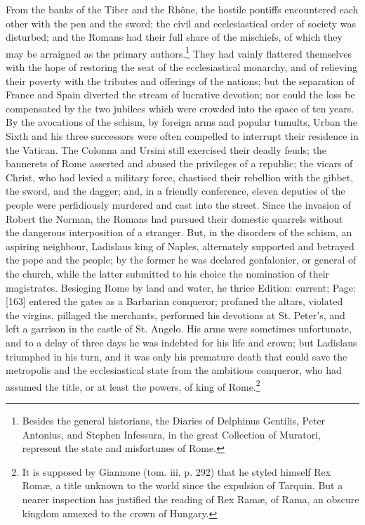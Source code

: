 From the banks of the Tiber and the Rhône, the hostile pontiffs encountered each other with the pen and the sword; the civil and ecclesiastical order of society was disturbed; and the Romans had their full share of the mischiefs, of which they may be arraigned as the primary authors.\footnote{Besides the general historians, the Diaries of Delphinus Gentilis, Peter Antonius, and Stephen Infessura, in the great Collection of Muratori, represent the state and misfortunes of Rome.} They had vainly flattered themselves with the hope of restoring the seat of the ecclesiastical monarchy, and of relieving their poverty with the tributes and offerings of the nations; but the separation of France and Spain diverted the stream of lucrative devotion; nor could the loss be compensated by the two jubilees which were crowded into the space of ten years. By the avocations of the schism, by foreign arms and popular tumults, Urban the Sixth and his three successors were often compelled to interrupt their residence in the Vatican. The Colonna and Ursini still exercised their deadly feuds; the bannerets of Rome asserted and abused the privileges of a republic; the vicars of Christ, who had levied a military force, chastised their rebellion with the gibbet, the sword, and the dagger; and, in a friendly conference, eleven deputies of the people were perfidiously murdered and cast into the street. Since the invasion of Robert the Norman, the Romans had pursued their domestic quarrels without the dangerous interposition of a stranger. But, in the disorders of the schism, an aspiring neighbour, Ladislaus king of Naples, alternately supported and betrayed the pope and the people; by the former he was declared gonfalonier, or general of the church, while the latter submitted to his choice the nomination of their magistrates. Besieging Rome by land and water, he thrice Edition: current; Page: [163] entered the gates as a Barbarian conqueror; profaned the altars, violated the virgins, pillaged the merchants, performed his devotions at St. Peter\texthebrew{}’s, and left a garrison in the castle of St. Angelo. His arms were sometimes unfortunate, and to a delay of three days he was indebted for his life and crown; but Ladislaus triumphed in his turn, and it was only his premature death that could save the metropolis and the ecclesiastical state from the ambitious conqueror, who had assumed the title, or at least the powers, of king of Rome.\footnote{It is supposed by Giannone (tom. iii. p. 292) that he styled himself Rex Romæ, a title unknown to the world since the expulsion of Tarquin. But a nearer inspection has justified the reading of Rex Ramæ, of Rama, an obscure kingdom annexed to the crown of Hungary.}

